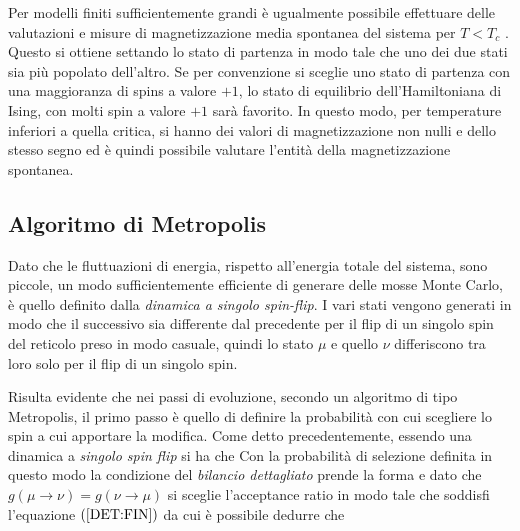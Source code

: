 \documentclass[a4paper,12pt]{article}
\begin{document}
Per modelli finiti sufficientemente grandi è ugualmente possibile effettuare delle valutazioni e misure di magnetizzazione media spontanea del sistema per $T < T_c$ . Questo si ottiene settando lo stato di partenza in modo tale che uno dei due stati sia più popolato dell’altro. Se per convenzione si sceglie uno stato di partenza con una maggioranza di spins a valore $+1$, lo stato di equilibrio dell’Hamiltoniana di Ising, con molti spin a valore $+1$ sarà favorito. In questo modo, per temperature inferiori a quella critica, si hanno dei valori di magnetizzazione non nulli e dello stesso segno ed è quindi possibile valutare l’entità della magnetizzazione spontanea.

\subsection{Algoritmo di Metropolis}
Dato che le fluttuazioni di energia, rispetto all'energia totale del sistema, sono piccole, un modo sufficientemente efficiente di generare delle mosse Monte Carlo, è quello definito dalla \emph{dinamica a singolo spin-flip}. I vari stati vengono generati in modo che il successivo sia differente dal precedente per il flip di un singolo spin del reticolo preso in modo casuale, quindi lo stato $\mu$ e quello $\nu$ differiscono tra loro solo per il flip di un singolo spin. 

Risulta evidente che nei passi di evoluzione, secondo un algoritmo di tipo Metropolis, il primo passo \`e quello di definire la probabilit\`a con cui scegliere lo spin a cui apportare la modifica. Come detto precedentemente, essendo una dinamica a \emph{singolo spin flip} si ha che 
Con la probabilità di selezione definita in questo modo la condizione del \emph{bilancio dettagliato} prende la forma
e dato che $g(\mu\to\nu)=g(\nu\to\mu)$ si sceglie l'acceptance ratio in modo tale che soddisfi l'equazione $(\ref{DET:FIN})$
da cui è possibile dedurre che
\end{document}
